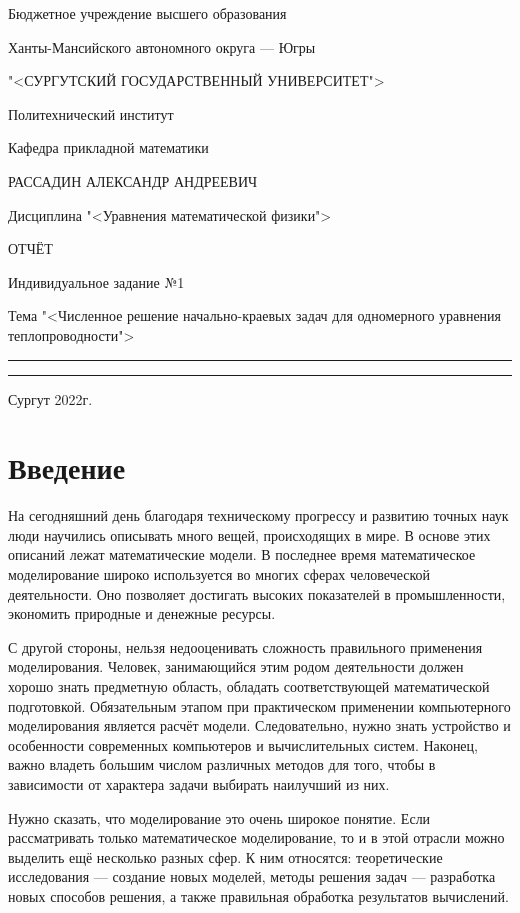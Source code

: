 \documentclass[oneside, final, 14pt]{report}
\begin{document}
\Large
\centerline{Бюджетное учреждение высшего образования}
\vskip1.0mm
\centerline{Ханты-Мансийского автономного округа --- Югры}   
\centerline{"<СУРГУТСКИЙ ГОСУДАРСТВЕННЫЙ УНИВЕРСИТЕТ">}
\vskip8mm
\centerline{Политехнический институт}
\centerline{\hfill\hrulefill\hrulefill\hfill}
\vskip1mm
\centerline{Кафедра прикладной математики}
\vskip1cm
\centerline{РАССАДИН АЛЕКСАНДР АНДРЕЕВИЧ}
\vskip1cm
\centerline{Дисциплина "<Уравнения математической физики">}
\vskip3cm
\centerline{ОТЧЁТ}
\centerline{Индивидуальное задание №1}
\begin{center}
Тема "<Численное решение начально-краевых задач для одномерного уравнения теплопроводности">
\end{center}
\vfill
{} %
\begin{flushright}

 \rule{5cm}{0.1mm}
\end{flushright}
\vskip1cm
\begin{flushright}
 \rule{5cm}{0.1mm}
\end{flushright}
\centerline{Сургут 2022г.}
\newpage
\Large
\tableofcontents
\chapter{Введение}
На сегодняшний день благодаря техническому прогрессу и развитию точных наук люди научились описывать много вещей, происходящих в мире. В основе этих описаний лежат математические модели. В последнее время математическое моделирование широко используется во многих сферах человеческой деятельности. Оно позволяет достигать высоких показателей в промышленности, экономить природные и денежные ресурсы.

С другой стороны, нельзя недооценивать сложность правильного применения моделирования. Человек, занимающийся этим родом деятельности должен хорошо знать предметную область, обладать соответствующей математической подготовкой. Обязательным этапом при практическом применении компьютерного моделирования является расчёт модели. Следовательно, нужно знать устройство и особенности современных компьютеров и вычислительных систем. Наконец, важно владеть большим числом различных методов для того, чтобы в зависимости от характера задачи выбирать наилучший из них. 

Нужно сказать, что моделирование это очень широкое понятие. Если рассматривать только математическое моделирование, то и в этой отрасли можно выделить ещё несколько разных сфер. К ним относятся: теоретические исследования --- создание новых моделей, методы решения задач --- разработка новых способов решения, а также правильная обработка результатов вычислений. 
\end{document}
